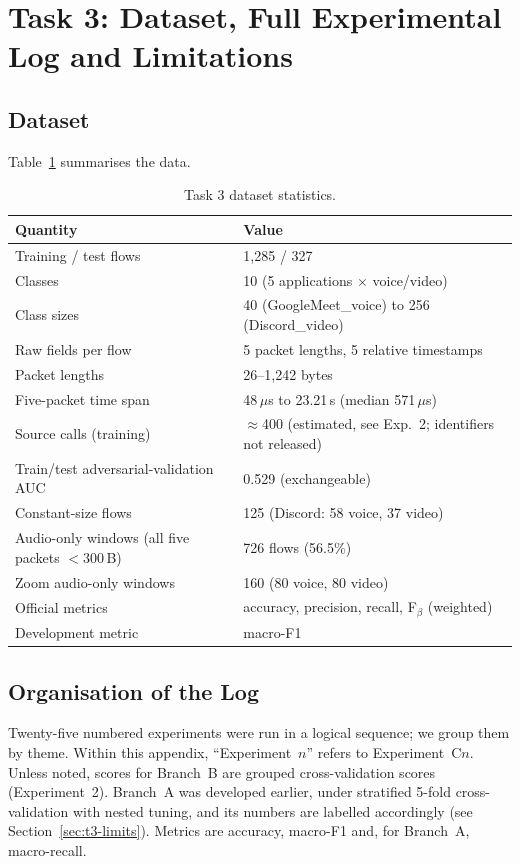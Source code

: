 \section{Task 3: Dataset, Full Experimental Log and Limitations}
\label{app:t3}
\renewcommand{\expprefix}{C}

\subsection{Dataset}

Table~\ref{tab:t3-data} summarises the data.

\begin{table}[h]
\caption{Task 3 dataset statistics.}
\label{tab:t3-data}
\centering
\begin{tabular}{ll}
\hline
Quantity & Value \\
\hline
Training / test flows & 1{,}285 / 327 \\
Classes & 10 (5 applications $\times$ voice/video) \\
Class sizes & 40 (GoogleMeet\_voice) to 256 (Discord\_video) \\
Raw fields per flow & 5 packet lengths, 5 relative timestamps \\
Packet lengths & 26--1{,}242 bytes \\
Five-packet time span & 48\,$\mu$s to 23.21\,s (median 571\,$\mu$s) \\
Source calls (training) & $\approx$400 (estimated, see Exp.~2; identifiers not released) \\
Train/test adversarial-validation AUC & 0.529 (exchangeable) \\
Constant-size flows & 125 (Discord: 58 voice, 37 video) \\
Audio-only windows (all five packets $<300$\,B) & 726 flows (56.5\%) \\
Zoom audio-only windows & 160 (80 voice, 80 video) \\
Official metrics & accuracy, precision, recall, F$_\beta$ (weighted) \\
Development metric & macro-F1 \\
\hline
\end{tabular}
\end{table}

\subsection{Organisation of the Log}

Twenty-five numbered experiments were run in a logical sequence; we group them
by theme. Within this appendix, ``Experiment~$n$'' refers to Experiment~C$n$. Unless noted, scores for Branch~B are grouped cross-validation scores
(Experiment~2). Branch~A was developed earlier, under stratified 5-fold
cross-validation with nested tuning, and its numbers are labelled accordingly
(see Section~\ref{sec:t3-limits}). Metrics are accuracy, macro-F1 and, for
Branch~A, macro-recall.

